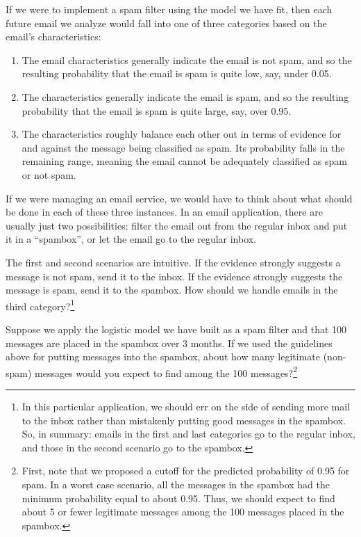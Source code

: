 If we were to implement a spam filter using the model we have fit, then each future email we analyze would fall into one of three categories based on the email's characteristics:
\begin{enumerate}
\item The email characteristics generally indicate the email is not spam, and so the resulting probability that the email is spam is quite low, say, under 0.05.
\item The characteristics generally indicate the email is spam, and so the resulting probability that the email is spam is quite large, say, over 0.95.
\item The characteristics roughly balance each other out in terms of evidence for and against the message being classified as spam. Its probability falls in the remaining range, meaning the email cannot be adequately classified as spam or not spam.
\end{enumerate}
If we were managing an email service, we would have to think about what should be done in each of these three instances. In an email application, there are usually just two possibilities: filter the email out from the regular inbox and put it in a ``spambox'', or let the email go to the regular inbox.

\begin{exercise}
The first and second scenarios are intuitive. If the evidence strongly suggests a message is not spam, send it to the inbox. If the evidence strongly suggests the message is spam, send it to the spambox. How should we handle emails in the third category?\footnote{In this particular application, we should err on the side of sending more mail to the inbox rather than mistakenly putting good messages in the spambox. So, in summary: emails in the first and last categories go to the regular inbox, and those in the second scenario go to the spambox.}
\end{exercise}

\begin{exercise}
Suppose we apply the logistic model we have built as a spam filter and that 100 messages are placed in the spambox over 3 months. If we used the guidelines above for putting messages into the spambox, about how many legitimate (non-spam) messages would you expect to find among the 100 messages?\footnote{First, note that we proposed a cutoff for the predicted probability of 0.95 for spam. In a worst case scenario, all the messages in the spambox had the minimum probability equal to about 0.95. Thus, we should expect to find about 5 or fewer legitimate messages among the 100 messages placed in the spambox.}
\end{exercise}


